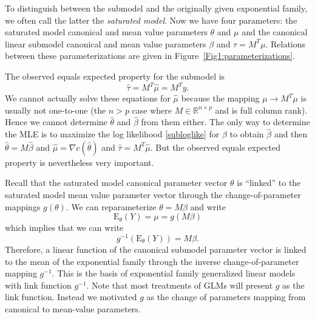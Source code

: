 \documentclass[12pt]{article}
\newcommand{\R}{\mathbb{R}}
\newcommand{\E}{\mathrm{E}}
\DeclareMathOperator{\E}{E}
\begin{document}
To distinguish between the submodel and the originally given exponential family, we often call the latter the \emph{saturated model}. Now we have four parameters: the saturated model canonical and mean value parameters $\theta$ and $\mu$ and the canonical linear submodel canonical and mean value parameters $\beta$ and $\tau = M^T\mu$. Relations between these parameterizations are given in Figure~\ref{Fig1:parameterizations}. 

The observed equals expected property for the submodel is
\begin{equation} \label{submodelmvp}
	\hat\tau = M^T\hat\mu = M^Ty.
\end{equation}
We cannot actually solve these equations for $\hat\mu$ because the mapping $\mu \to M^T\mu$ is usually not one-to-one (the $n > p$ case where $M \in \R^{n \times p}$ and is full column rank). Hence we cannot determine $\hat\theta$ and $\hat\beta$ from them either. The only way to determine the MLE is to maximize the log likelihood \eqref{subloglike} for $\beta$ to obtain $\hat\beta$ and then $\hat\theta = M\hat\beta$ and $\hat\mu = \nabla c(\hat\theta)$ and $\hat\tau = M^T\hat\mu$. But the observed equals expected property is nevertheless very important. %

\vspace{0.5cm}

\vspace{0.5cm}Recall that the saturated model canonical parameter vector $\theta$ is ``linked'' to the saturated model mean value parameter vector through the change-of-parameter mappings $g(\theta)$. We can reparameterize $\theta = M\beta$ and write
$$
 \E_\theta(Y) = \mu = g(M\beta) 
$$
which implies that we can write
$$
  g^{-1}\left(\E_\theta(Y)\right) = M\beta.
$$
Therefore, a linear function of the canonical submodel parameter vector is linked to the mean of the exponential family through the inverse change-of-parameter mapping $g^{-1}$. This is the basis of exponential family generalized linear models with link function $g^{-1}$. Note that most treatments of GLMs will present $g$ as the link function. Instead we motivated $g$ as the change of parameters mapping from canonical to mean-value parameters. 


\end{document}
